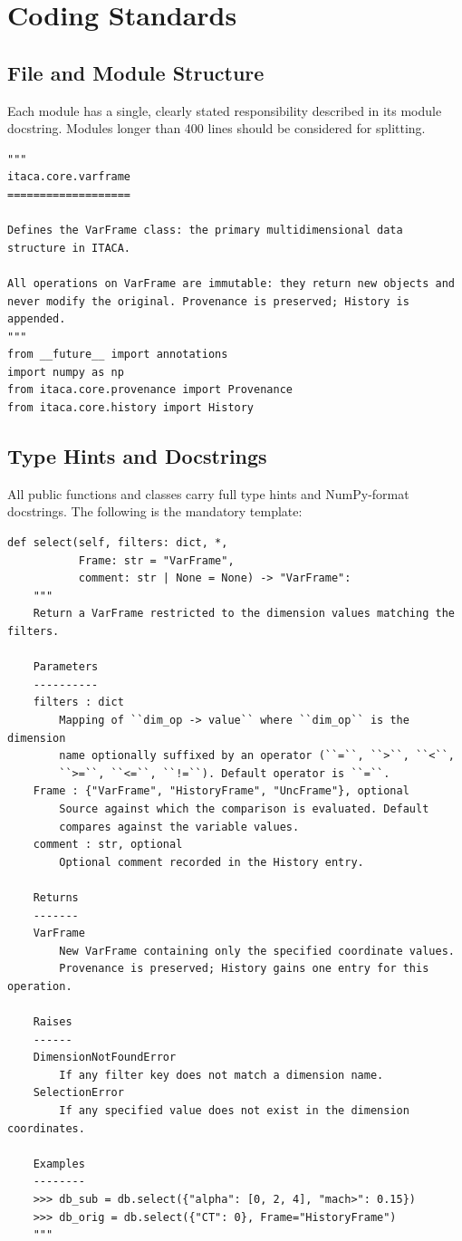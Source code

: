 \section{Coding Standards}

\subsection{File and Module Structure}

Each module has a single, clearly stated responsibility described in its
module docstring. Modules longer than 400 lines should be considered for
splitting.

\begin{lstlisting}
"""
itaca.core.varframe
===================

Defines the VarFrame class: the primary multidimensional data
structure in ITACA.

All operations on VarFrame are immutable: they return new objects and
never modify the original. Provenance is preserved; History is appended.
"""
from __future__ import annotations
import numpy as np
from itaca.core.provenance import Provenance
from itaca.core.history import History
\end{lstlisting}

\subsection{Type Hints and Docstrings}

All public functions and classes carry full type hints and NumPy-format
docstrings. The following is the mandatory template:

\begin{lstlisting}
def select(self, filters: dict, *,
           Frame: str = "VarFrame",
           comment: str | None = None) -> "VarFrame":
    """
    Return a VarFrame restricted to the dimension values matching the filters.

    Parameters
    ----------
    filters : dict
        Mapping of ``dim_op -> value`` where ``dim_op`` is the dimension
        name optionally suffixed by an operator (``=``, ``>``, ``<``,
        ``>=``, ``<=``, ``!=``). Default operator is ``=``.
    Frame : {"VarFrame", "HistoryFrame", "UncFrame"}, optional
        Source against which the comparison is evaluated. Default
        compares against the variable values.
    comment : str, optional
        Optional comment recorded in the History entry.

    Returns
    -------
    VarFrame
        New VarFrame containing only the specified coordinate values.
        Provenance is preserved; History gains one entry for this operation.

    Raises
    ------
    DimensionNotFoundError
        If any filter key does not match a dimension name.
    SelectionError
        If any specified value does not exist in the dimension coordinates.

    Examples
    --------
    >>> db_sub = db.select({"alpha": [0, 2, 4], "mach>": 0.15})
    >>> db_orig = db.select({"CT": 0}, Frame="HistoryFrame")
    """
\end{lstlisting}

